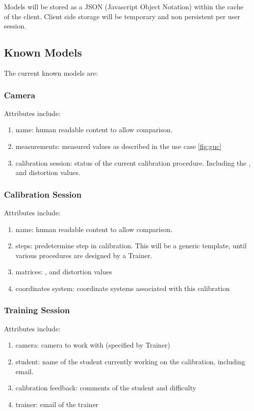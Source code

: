 \documentclass[11pt]{report}
\begin{document}
Models will be stored as a JSON (Javascript Object Notation) within the  cache of the client. Client side storage will be temporary and non persistent per user session.

\subsection{Known Models}

The current known models are:

\subsubsection{Camera}

Attributes include:

\begin{enumerate}
\item name: human readable content to allow comparison.
\item measurements: measured values as described in the use case \ref{fig:guc}
\item calibration session: status of the current calibration procedure. Including the ,  and distortion values.  
\end{enumerate}

\subsubsection{Calibration Session}

Attributes include:
\begin{enumerate}
\item name: human readable content to allow comparison.
\item steps: predetermine step in calibration. This will be a generic template, until various procedures are designed by a Trainer.
\item matrices: ,  and distortion values 
\item coordinates system: coordinate systems associated with this calibration 
\end{enumerate}

\subsubsection{Training Session}

Attributes include: 
\begin{enumerate}
\item camera: camera to work with (specified by Trainer) 
\item student: name of the student currently working on the calibration, including email.
\item calibration feedback: comments of the student and difficulty  
\item trainer: email of the trainer 
\end{enumerate}
\end{document}

